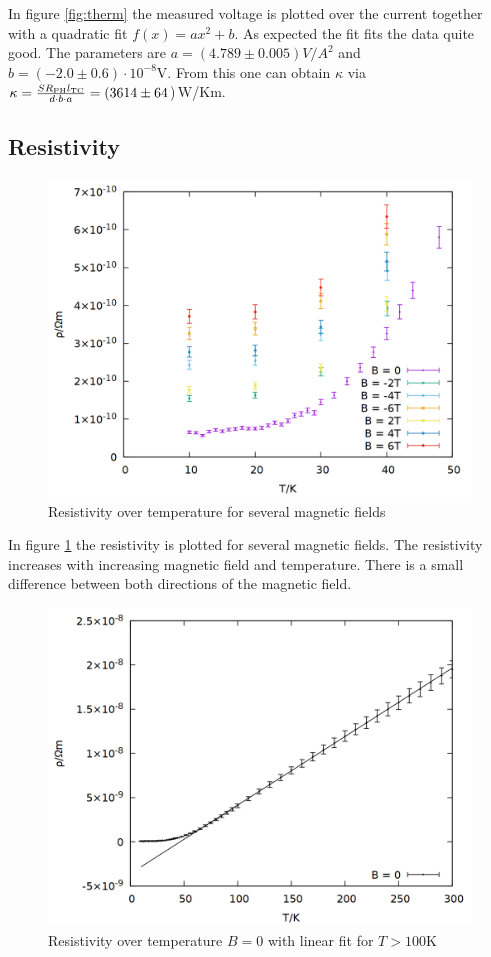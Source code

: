 In figure \ref{fig:therm} the measured voltage is plotted over the current together with a quadratic fit $f(x) = ax^2 + b$. As expected the fit fits the data quite good. The parameters are $a = (4.789 \pm 0.005) V/A^2$ and $b = (-2.0 \pm 0.6) \cdot 10^{-8} \si{\volt}$. From this one can obtain $\kappa$ via $\kappa = \frac{S R_\mathrm{PH} l_\mathrm{TC}}{d\cdot b \cdot a} = (3614 \pm 64$)\,\si{W/Km}.

\subsection{Resistivity}
\begin{figure}
    \centering
    \includegraphics[width=0.7\linewidth]{data/rho_B.png}
    \caption{Resistivity over temperature for several magnetic fields}
    \label{fig:rho_B}
\end{figure}

In figure \ref{fig:rho_B} the resistivity is plotted for several magnetic fields. The resistivity increases with increasing magnetic field and temperature. There is a small difference between both directions of the magnetic field.

\begin{figure}
    \centering
    \includegraphics[width=0.7\linewidth]{data/rho_B0.png}
    \caption{Resistivity over temperature $B = 0$ with linear fit for $T > 100\si{\kelvin}$}
    \label{fig:rho_B0}
\end{figure}

